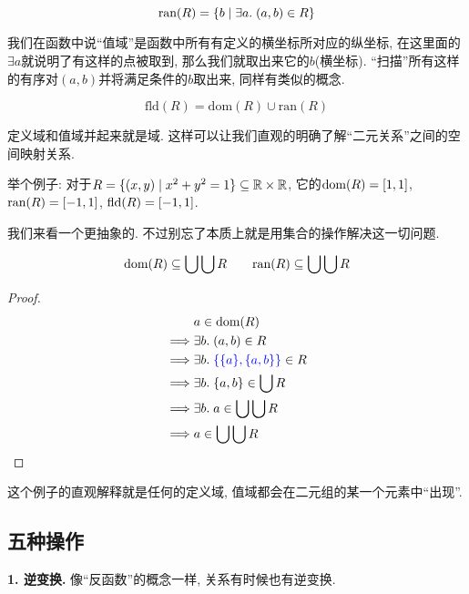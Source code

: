 \begin{definition}[值域 (Range)]
  \[
    \text{ran}(R) = \{b \mid \exists a.\; (a,b) \in R\}
  \]
\end{definition}

我们在函数中说``值域''是函数中所有有定义的横坐标所对应的纵坐标, 在这里面的$\exists a$就说明了有这样的点被取到, 那么我们就取出来它的$b$(横坐标). ``扫描''所有这样的有序对$(a,b)$并将满足条件的$b$取出来, 同样有类似的概念. 

\begin{definition}[域 (Field)]
  \[
    \text{fld}(R) = \text{dom}(R) \cup \text{ran}(R)
  \]
\end{definition}

定义域和值域并起来就是域. 这样可以让我们直观的明确了解``二元关系''之间的空间映射关系. 

举个例子: 对于$R = \{(x, y) \mid x^2 + y^2 = 1\} \subseteq \mathbb{R} \times \mathbb{R}$, 它的$\text{dom}(R) = [1, 1]$, $\text{ran}(R) = [-1, 1]$, $\text{fld}(R) = [-1, 1]$. 

我们来看一个更抽象的. 不过别忘了本质上就是用集合的操作解决这一切问题. 

\begin{theorem}
  \[
    \text{dom}(R) \subseteq \bigcup \bigcup R \qquad
    \text{ran}(R) \subseteq \bigcup \bigcup R
  \]
\end{theorem}

\begin{proof}
    \begin{align*}
      &a \in \text{dom}(R) \\
      \implies& \exists b.\; (a, b) \in R \\
      \implies& \exists b.\; \textcolor{blue}{\{\{a\}, \{a, b\}\}} \in R \\
      \implies& \exists b.\; \{a, b\} \in \bigcup R \\
      \implies& \exists b.\; a \in \bigcup\bigcup R \\
      \implies& a \in \bigcup\bigcup R
    \end{align*}
\end{proof}

这个例子的直观解释就是任何的定义域, 值域都会在二元组的某一个元素中``出现''. 

\subsection{五种操作}

\textbf{1. 逆变换. }像``反函数''的概念一样, 关系有时候也有逆变换. 

